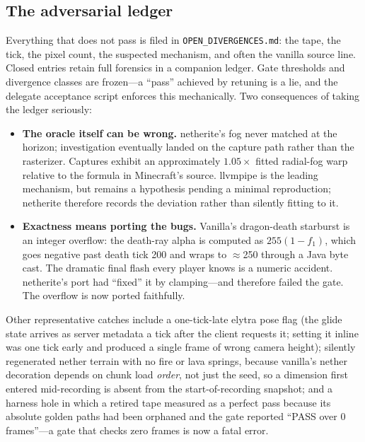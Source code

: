 \documentclass[11pt]{article}
\begin{document}
\subsection{The adversarial ledger}
\label{sec:ledger}

Everything that does not pass is filed in \texttt{OPEN\_DIVERGENCES.md}: the tape, the tick, the pixel count, the suspected mechanism, and often the vanilla source line. Closed entries retain full forensics in a companion ledger. Gate thresholds and divergence classes are frozen---a ``pass'' achieved by retuning is a lie, and the delegate acceptance script enforces this mechanically. Two consequences of taking the ledger seriously:

\begin{itemize}
\item \textbf{The oracle itself can be wrong.} netherite's fog never matched at the horizon; investigation eventually landed on the capture path rather than the rasterizer. Captures exhibit an approximately $1.05\times$ fitted radial-fog warp relative to the formula in Minecraft's source. llvmpipe is the leading mechanism, but remains a hypothesis pending a minimal reproduction; netherite therefore records the deviation rather than silently fitting to it.
\item \textbf{Exactness means porting the bugs.} Vanilla's dragon-death starburst is an integer overflow: the death-ray alpha is computed as $255(1-f_1)$, which goes negative past death tick 200 and wraps to $\approx$250 through a Java byte cast. The dramatic final flash every player knows is a numeric accident. netherite's port had ``fixed'' it by clamping---and therefore failed the gate. The overflow is now ported faithfully.
\end{itemize}

Other representative catches include a one-tick-late elytra pose flag (the glide state arrives as server metadata a tick after the client requests it; setting it inline was one tick early and produced a single frame of wrong camera height); silently regenerated nether terrain with no fire or lava springs, because vanilla's nether decoration depends on chunk load \emph{order}, not just the seed, so a dimension first entered mid-recording is absent from the start-of-recording snapshot; and a harness hole in which a retired tape measured as a perfect pass because its absolute golden paths had been orphaned and the gate reported ``PASS over 0 frames''---a gate that checks zero frames is now a fatal error.
\end{document}
